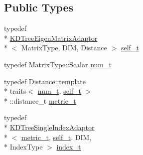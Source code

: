 \subsection*{Public Types}
\begin{DoxyCompactItemize}
\item 
typedef \\*
\hyperlink{structnanoflann_1_1_k_d_tree_eigen_matrix_adaptor}{K\-D\-Tree\-Eigen\-Matrix\-Adaptor}\\*
$<$ Matrix\-Type, D\-I\-M, Distance $>$ \hyperlink{structnanoflann_1_1_k_d_tree_eigen_matrix_adaptor_a4c0c1ed66c119195d5d35f5a87bf54c5}{self\-\_\-t}
\item 
typedef Matrix\-Type\-::\-Scalar \hyperlink{structnanoflann_1_1_k_d_tree_eigen_matrix_adaptor_a5198c559d4134cbb14767e10d6945748}{num\-\_\-t}
\item 
typedef Distance\-::template \\*
traits$<$ \hyperlink{structnanoflann_1_1_k_d_tree_eigen_matrix_adaptor_a5198c559d4134cbb14767e10d6945748}{num\-\_\-t}, \hyperlink{structnanoflann_1_1_k_d_tree_eigen_matrix_adaptor_a4c0c1ed66c119195d5d35f5a87bf54c5}{self\-\_\-t} $>$\\*
\-::distance\-\_\-t \hyperlink{structnanoflann_1_1_k_d_tree_eigen_matrix_adaptor_a77aec885161810b958097f7725fc407e}{metric\-\_\-t}
\item 
typedef \\*
\hyperlink{classnanoflann_1_1_k_d_tree_single_index_adaptor}{K\-D\-Tree\-Single\-Index\-Adaptor}\\*
$<$ \hyperlink{structnanoflann_1_1_k_d_tree_eigen_matrix_adaptor_a77aec885161810b958097f7725fc407e}{metric\-\_\-t}, \hyperlink{structnanoflann_1_1_k_d_tree_eigen_matrix_adaptor_a4c0c1ed66c119195d5d35f5a87bf54c5}{self\-\_\-t}, D\-I\-M, \\*
Index\-Type $>$ \hyperlink{structnanoflann_1_1_k_d_tree_eigen_matrix_adaptor_abe94a08556e96937c80f8e13ba668b6b}{index\-\_\-t}
\end{DoxyCompactItemize}
